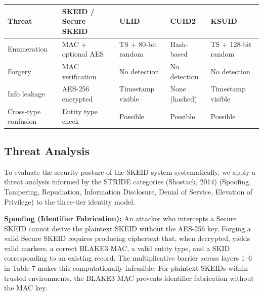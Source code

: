 \documentclass[fleqn,10pt,lineno]{wlpeerj}
\newcounter{none} %
\begin{document}
{\def\LTcaptype{none} %
\begin{longtable}[]{@{}
  >{\raggedright\arraybackslash}p{}
  >{\raggedright\arraybackslash}p{}
  >{\raggedright\arraybackslash}p{}
  >{\raggedright\arraybackslash}p{}
  >{\raggedright\arraybackslash}p{}@{}}
\toprule\noalign{}
\begin{minipage}[b]{\linewidth}\raggedright
Threat
\end{minipage} & \begin{minipage}[b]{\linewidth}\raggedright
SKEID / Secure SKEID
\end{minipage} & \begin{minipage}[b]{\linewidth}\raggedright
ULID
\end{minipage} & \begin{minipage}[b]{\linewidth}\raggedright
CUID2
\end{minipage} & \begin{minipage}[b]{\linewidth}\raggedright
KSUID
\end{minipage} \\
\midrule\noalign{}
\endhead
\bottomrule\noalign{}
\endlastfoot
Enumeration & MAC + optional AES & TS + 80-bit random & Hash-based & TS
+ 128-bit random \\
Forgery & MAC verification & No detection & No detection & No
detection \\
Info leakage & AES-256 encrypted & Timestamp visible & None (hashed) &
Timestamp visible \\
Cross-type confusion & Entity type check & Possible & Possible &
Possible \\
\end{longtable}
}

\subsection{Threat Analysis}\label{threat-analysis}

To evaluate the security posture of the SKEID system systematically, we
apply a threat analysis informed by the STRIDE categories (Shostack,
2014) (Spoofing, Tampering, Repudiation, Information Disclosure, Denial
of Service, Elevation of Privilege) to the three-tier identity model.

\textbf{Spoofing (Identifier Fabrication):} An attacker who intercepts a
Secure SKEID cannot derive the plaintext SKEID without the AES-256 key.
Forging a valid Secure SKEID requires producing ciphertext that, when
decrypted, yields valid markers, a correct BLAKE3 MAC, a valid entity
type, and a SKID corresponding to an existing record. The multiplicative
barrier across layers 1--6 in Table 7 makes this computationally
infeasible. For plaintext SKEIDs within trusted environments, the BLAKE3
MAC prevents identifier fabrication without the MAC key.
\end{document}
